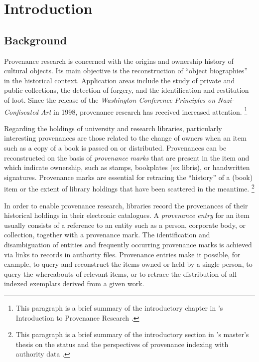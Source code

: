\chapter{Introduction}
\label{chap:intro}

\section{Background}
\label{sec:background}

Provenance research is concerned with the origins and ownership history
of cultural objects. Its main objective is the reconstruction of
\enquote{object biographies} in the historical context.
Application areas 
include
the study of private and public collections,
the detection of forgery,
and the identification and restitution of loot.
Since the release of the
\emph{Washington Conference Principles on Nazi-Confiscated Art} \autocite{WashingtonPrinciples}
in 1998,
provenance research has received increased attention.%
\footnote{%
  This paragraph is a brief summary of the introductory chapter in \citeauthor{Zuschlag2022}'s
  Introduction to Provenance Research \autocite[§1]{Zuschlag2022}.%
}

Regarding the holdings of university and research libraries,
particularly interesting provenances are those related to the change of
owners when an item such as a copy of a book is passed on or distributed. %
Provenances can be reconstructed on the basis of \emph{provenance marks} that 
are present in the item and which indicate ownership,
such as stamps, bookplates (ex libris), or handwritten signatures.
Provenance marks are essential for retracing
the \enquote{history} of a (book) item
or the extent of library holdings that have been scattered in the meantime.%
\footnote{%
  This paragraph is a brief summary of the introductory section 
  in \citeauthor{Hakelberg2016}'s master's thesis on the 
  status and the perspectives of provenance indexing with authority data \autocite[§1.1]{Hakelberg2016}.%
}

In order to enable provenance research,
libraries record the provenances of their historical holdings
in their electronic catalogues.
A \emph{provenance entry} for an item usually consists of a reference to an entity such as a person, corporate body, or collection,
together with a provenance mark.
The identification and disambiguation of entities and frequently occurring provenance marks
is achieved via links to records in authority files.
Provenance entries make it possible, for example,
to query and reconstruct the items owned or held by a single person,
to query the whereabouts of relevant items,
or to retrace the distribution of all indexed exemplars derived from a given work.


